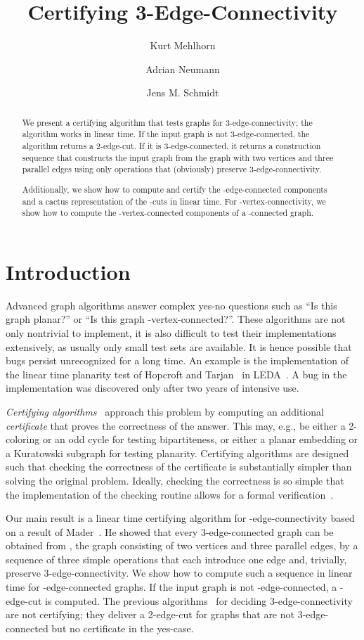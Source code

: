 \documentclass[paper=a4]{scrartcl}
\title{Certifying 3-Edge-Connectivity}\author{Kurt Mehlhorn \and Adrian Neumann \and Jens M. Schmidt}
\begin{document}
\maketitle
\begin{abstract} We present a certifying algorithm that tests
  graphs for 3-edge-connectivity; the algorithm works in linear time.  If the input graph is not
  3-edge-connected, the algorithm returns a 2-edge-cut. If it is
  3-edge-connected, it returns a construction sequence that
  constructs the input graph from the graph with two vertices and three parallel edges using
  only operations that (obviously) preserve 3-edge-connectivity.

Additionally, we show how to compute and certify the -edge-connected components and a cactus representation of the -cuts in linear time. For -vertex-connectivity, we show how to compute the -vertex-connected components of a -connected graph.
\end{abstract}



\section{Introduction}
Advanced graph algorithms answer complex yes-no questions such as ``Is this graph planar?'' or ``Is this graph -vertex-connected?''. These algorithms are not only nontrivial to implement, it is also difficult to test their implementations extensively, as usually only small test sets are available. It is hence possible that bugs persist unrecognized for a long time. An example is the implementation of the linear time planarity test of Hopcroft and Tarjan~\cite{HT} in LEDA~\cite{Mehlhorn1999}. A bug in the implementation was discovered only after two years of intensive use.

\emph{Certifying algorithms}~\cite{McConnell2011} approach this problem by computing an additional \emph{certificate} that proves the correctness of the answer. This may, e.g., be either a 2-coloring or an odd cycle for testing bipartiteness, or either a planar embedding or a Kuratowski subgraph for testing planarity. Certifying algorithms are designed such that checking the correctness of the certificate is substantially simpler than solving the original problem. Ideally, checking the correctness is so simple that the implementation of the checking routine allows for a formal verification~\cite{FormalVerification,Verification-CertComps-AutoCorres-Simpl}.

Our main result is a linear time certifying algorithm for -edge-connectivity based on a result of Mader~\cite{Mader1978}. He showed that every 3-edge-connected graph can be obtained from , the graph consisting of two vertices and three parallel edges, by a sequence of three simple operations that each introduce one edge and, trivially, preserve 3-edge-connectivity. We show how to compute such a sequence in linear time for -edge-connected graphs. If the input graph is not -edge-connected, a -edge-cut is computed. The previous algorithms~\cite{Galil1991,Nagamochi1992a,Taoka1992,Tsin2007,Tsin2009} for deciding 3-edge-connectivity are not certifying; they deliver a 2-edge-cut for graphs that are not 3-edge-connected but no certificate in the yes-case.
\end{document}
